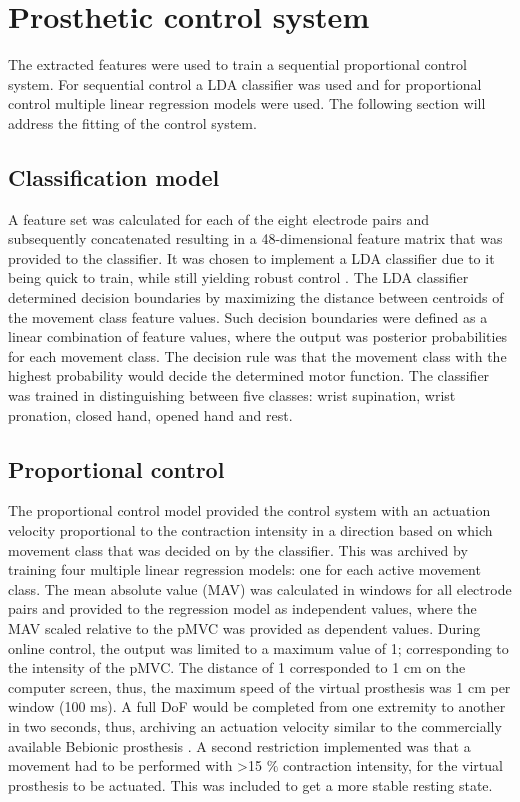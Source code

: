 \section{Prosthetic control system}
The extracted features were used to train a sequential proportional control system. For sequential control a LDA classifier was used and for proportional control multiple linear regression models were used. The following section will address the fitting of the control system. 

\subsection{Classification model}
A feature set was calculated for each of the eight electrode pairs and subsequently concatenated resulting in a 48-dimensional feature matrix that was provided to the classifier. It was chosen to implement a LDA classifier due to it being quick to train, while still yielding robust control \cite{Englehart2003}. The LDA classifier determined decision boundaries by maximizing the distance between centroids of the movement class feature values. Such decision boundaries were defined as a linear combination of feature values, where the output was posterior probabilities for each movement class. The decision rule was that the movement class with the highest probability would decide the determined motor function. The classifier was trained in distinguishing between five classes: wrist supination, wrist pronation, closed hand, opened hand and rest.  

\subsection{Proportional control}
The proportional control model provided the control system with an actuation velocity proportional to the contraction intensity in a direction based on which movement class that was decided on by the classifier. This was archived by training four multiple linear regression models: one for each active movement class. The mean absolute value (MAV) was calculated in windows for all electrode pairs and provided to the regression model as independent values, where the MAV scaled relative to the pMVC was provided as dependent values. During online control, the output was limited to a maximum value of 1; corresponding to the intensity of the pMVC. The distance of 1 corresponded to 1 cm on the computer screen, thus, the maximum speed of the virtual prosthesis was 1 cm per window (100 ms). A full DoF would be completed from one extremity to another in two seconds, thus, archiving an actuation velocity similar to the commercially available Bebionic prosthesis \cite{Belter2013}. A second restriction implemented was that a movement had to be performed with >15 $\percent$ contraction intensity, for the virtual prosthesis to be actuated. This was included to get a more stable resting state. 